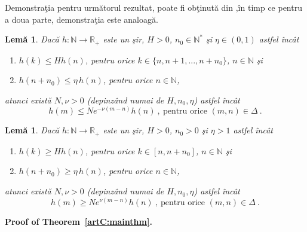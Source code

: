 \documentclass[ a4paper, 12pt]{report}
\newcommand{\R}{\mathbb{R}}
\newcommand{\N}{\mathbb{N}}
\newtheorem{lema}[theorem]{\bf{Lem\u a}}
\theoremstyle{definition}
\theoremstyle{remark}
\numberwithin{equation}{section}
\begin{document}
Demonstra\c tia pentru urm\u atorul rezultat, poate fi ob\c tinut\u a din \cite[20C, p.39]{MasseraSchaffer},\^in timp ce pentru a doua parte, demonstra\c tia este analoag\u a.

\begin{lema}
\label{artC:lemma1:stability}
Dac\u a $h:\N\to\R_+$ este un \c sir, $H>0$, $n_0\in\N^*$ \c si $\eta\in(0,1)$ astfel \^inc\^at
\begin{enumerate}
\item[(i)] $h(k)\leq H h(n)$, pentru orice $k\in\{n,n+1,...,n+n_0\}$, $n\in\N$ \c si
\item[(ii)] $h(n+n_0)\leq\eta\,h(n)$, pentru orice $n\in\N$,
\end{enumerate}
atunci exist\u a $N,\nu>0$ (depinz\^and numai de $H,n_0,\eta$) astfel \^inc\^at
$$h(m)\leq Ne^{-\nu(m-n)}h(n)\ ,\ \text{pentru orice } (m,n)\in\Delta\ .$$
\end{lema}

\begin{lema}
\label{artC:lemma2:blowup}
Dac\u a $h:\N\to\R_+$ este un \c sir, $H>0$, $n_0>0$ \c si $\eta>1$ astfel \^inc\^at
\begin{enumerate}
\item[(i)] $h(k)\geq H h(n)$, pentru orice $k\in[n,n+n_0]$, $n\in\N$ \c si
\item[(ii)] $h(n+n_0)\geq\eta\,h(n)$, pentru orice $n\in\N$,
\end{enumerate}
atunci exist\u a $N,\nu>0$ (depinz\^and numai de $H,n_0,\eta$) astfel \^inc\^at
$$h(m)\geq Ne^{\nu(m-n)}h(n)\ ,\ \text{pentru orice } (m,n)\in\Delta\ .$$
\end{lema}


\noindent
\textbf{Proof of Theorem~\ref{artC:mainthm}.}
\medskip
\end{document}
